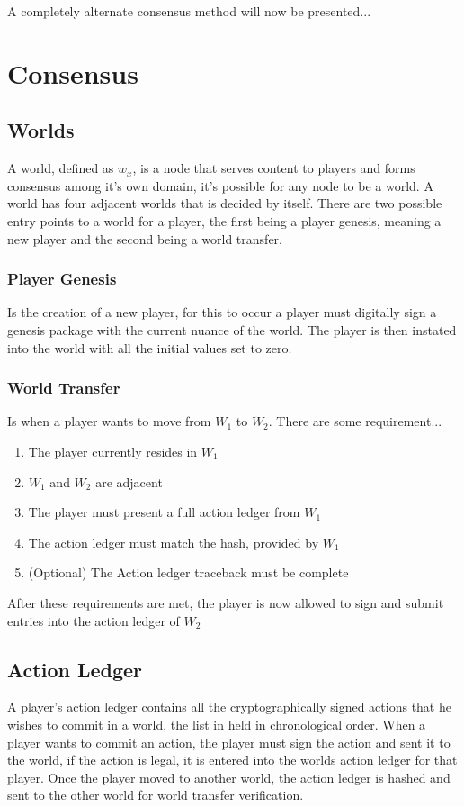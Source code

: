 \documentclass[runningheads,a4paper]{llncs}
\begin{document}
A completely alternate consensus method will now be presented...

\section{Consensus}

\subsection{Worlds}
A world, defined as $w_x$, is a node that serves content to players and forms consensus among it's own domain, it's possible for any node to be a world. A world has four adjacent worlds that is decided by itself. There are two possible entry points to a world for a player, the first being a player genesis, meaning a new player and the second being a world transfer.

\subsubsection{Player Genesis} Is the creation of a new player, for this to occur a player must digitally sign a genesis package with the current nuance of the world. The player is then instated into the world with all the initial values set to zero. 

\subsubsection{World Transfer} Is when a player wants to move from $W_1$ to $W_2$. There are some requirement...

\begin{enumerate}
\item The player currently resides in $W_1$
\item $W_1$ and $W_2$ are adjacent
\item The player must present a full action ledger from $W_1$ 
\item The action ledger must match the hash, provided by $W_1$
\item (Optional) The Action ledger traceback must be complete
\end{enumerate}

After these requirements are met, the player is now allowed to sign and submit entries into the action ledger of $W_2$

\subsection{Action Ledger}
A player's action ledger contains all the cryptographically signed actions that he wishes to commit in a world, the list in held in chronological order. When a player wants to commit an action, the player must sign the action and sent it to the world, if the action is legal, it is entered into the worlds action ledger for that player. Once the player moved to another world, the action ledger is hashed and sent to the other world for world transfer verification.
\end{document}
